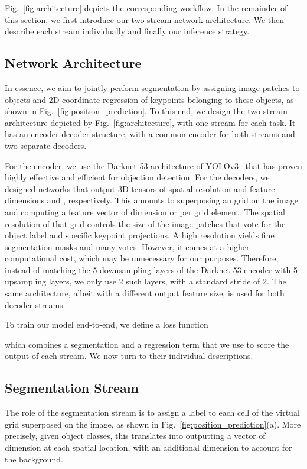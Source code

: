 \documentclass[10pt,twocolumn,letterpaper]{article}
\begin{document}
Fig.~\ref{fig:architecture} depicts the corresponding workflow.  In the remainder of this section, we first introduce our two-stream network architecture. We then describe each stream individually and finally our inference strategy.

\subsection{Network Architecture}
\label{eq:network}

In essence, we aim to jointly perform segmentation by assigning image patches to objects and  2D coordinate regression of keypoints belonging to these objects, as shown in Fig.~\ref{fig:position_prediction}. To this end,  we design the two-stream architecture depicted by Fig.~\ref{fig:architecture}, with one stream for each task. It has an encoder-decoder structure, with a common encoder for both streams and two separate decoders. 

For the encoder, we use the  Darknet-53 architecture of YOLOv3~\cite{Redmon18} that has proven highly effective and efficient for objection detection. For the decoders, we designed networks that output 3D tensors of spatial resolution  and feature dimensions  and , respectively. This amounts to superposing an  grid on the image and computing a feature vector of dimension  or  per grid element. The spatial resolution of that grid controls the size of the image patches that vote for the object label and specific keypoint projections. A high resolution yields fine segmentation masks and many votes. However, it comes at a higher computational cost, which may be unnecessary for our purposes. Therefore, instead of matching the 5 downsampling layers of the Darknet-53 encoder with 5 upsampling layers, we only use 2 such layers, with a standard stride of 2. The same architecture, albeit with a different output feature size, is used for both decoder streams.

To train our model end-to-end, we define a loss function

which combines a segmentation and a regression term that we use to score the output of each stream. We now turn to their individual descriptions.  

\subsection{Segmentation Stream}
\label{sec:seg}

The role of the segmentation stream is to assign a label to each cell of the virtual  grid superposed on the image, as shown in Fig.~\ref{fig:position_prediction}(a). 
More precisely, given  object classes, this translates into outputting a vector of dimension  at each spatial location, with an additional dimension to account for the background.
\end{document}
